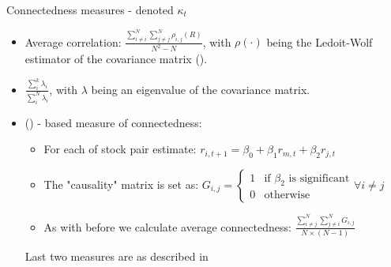 \documentclass{beamer}
\begin{document}
\begin{frame}{Connectedness measures - denoted $\kappa_t$}

    \begin{itemize}
        \item Average correlation: $\frac{\sum_{i \neq i}^{N} \sum_{j \neq j}^{N} \rho_{i,j}(R)}{N^2-N}$,  with $\rho(\cdot)$ being the Ledoit-Wolf estimator of the covariance matrix (\cite{ledoit}).
        \item $\frac{\sum_{i}^{k} \lambda_i}{\sum_{i}^{N} \lambda_i}$, with $\lambda$ being an eigenvalue of the covariance matrix. 
        \item (\cite{granger}) - based measure of connectedness:
        \begin{itemize}
            \item For each of stock pair estimate: $r_{i,t+1} = \beta_0 + \beta_1 r_{m, t} + \beta_2 r_{j, t}$
            \item The "causality" matrix is set as: $G_{i,j} = \begin{cases}
                1  & \text{if } \beta_2 \text{ is significant} \\
                0 & \text{otherwise}
              \end{cases} \forall i \neq j$
            \item As with before we calculate average connectedness: $\frac{\sum_{i \neq j}^{N} \sum_{j \neq i}^{N} G_{i,j}}{ N \times (N-1)}$
        \end{itemize}
    
        Last two measures are as described in \cite{billio}
    \end{itemize}

\end{frame}
\end{document}
